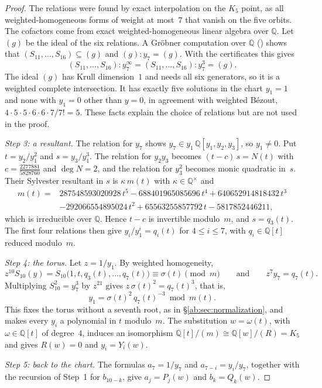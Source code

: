 \documentclass[a4paper,11pt]{article}
\newcommand{\filename}[1]{\texttt{\seqsplit{#1}}}
\theoremstyle{plain}
\theoremstyle{definition}
\theoremstyle{remark}
\begin{document}
\begin{proof}
The relations were found by exact interpolation on the $K_5$ point, as all weighted-homogeneous forms of weight at most~$7$ that vanish on the five orbits. The cofactors come from exact weighted-homogeneous linear algebra over $\mathbb{Q}$. Let $(g)$ be the ideal of the six relations. A Gr\"obner computation over $\mathbb{Q}$ (\filename{saturation\_check.py}) shows that $(S_{11},\dots,S_{16})\subseteq(g)$ and $(g):y_7=(g)$. With the certificates this gives
\[
(S_{11},\dots,S_{16}):y_7^\infty=(S_{11},\dots,S_{16}):y_7^3=(g).
\]
The ideal $(g)$ has Krull dimension~$1$ and needs all six generators, so it is a weighted complete intersection. It has exactly five solutions in the chart $y_1=1$ and none with $y_1=0$ other than $y=0$, in agreement with weighted B\'ezout, $4\cdot5\cdot5\cdot6\cdot6\cdot7/7!=5$. These facts explain the choice of relations but are not used in the proof.

\emph{Step 3: a resultant.} The relation for $y_7$ shows $y_7\in y_1\,\mathbb{Q}[y_1,y_2,y_3]$, so $y_1\neq0$. Put $t=y_2/y_1^2$ and $s=y_3/y_1^3$. The relation for $y_2y_3$ becomes $(t-c)\,s=N(t)$ with $c=\tfrac{2277881}{5828760}$ and $\deg N=2$, and the relation for $y_3^2$ becomes monic quadratic in~$s$. Their Sylvester resultant in $s$ is $\kappa\,m(t)$ with $\kappa\in\mathbb{Q}^\times$ and
\[
\begin{aligned}
m(t)={}&287548593020928\,t^5-688401965085696\,t^4+640652914818432\,t^3\\
&-292066554895024\,t^2+65563255857792\,t-5817852446211,
\end{aligned}
\]
which is irreducible over $\mathbb{Q}$. Hence $t-c$ is invertible modulo~$m$, and $s=q_3(t)$. The first four relations then give $y_i/y_1^i=q_i(t)$ for $4\le i\le 7$, with $q_i\in\mathbb{Q}[t]$ reduced modulo~$m$.

\emph{Step 4: the torus.} Let $z=1/y_1$. By weighted homogeneity,
\[
z^{10}S_{10}(y)=S_{10}\bigl(1,t,q_3(t),\dots,q_7(t)\bigr)\equiv\sigma(t)\pmod m\qquad\text{and}\qquad z^7y_7=q_7(t).
\] Multiplying $S_{10}^2=y_7^3$ by $z^{21}$ gives $z\,\sigma(t)^2=q_7(t)^3$, that is,
\[
y_1=\sigma(t)^2\,q_7(t)^{-3}\bmod m(t).
\]
This fixes the torus without a seventh root, as in \S\ref{ab:sec:normalization}, and makes every $y_i$ a polynomial in $t$ modulo~$m$. The substitution $w=\omega(t)$, with $\omega\in\mathbb{Q}[t]$ of degree~$4$, induces an isomorphism $\mathbb{Q}[t]/(m)\cong\mathbb{Q}[w]/(R)=K_5$ and gives $R(w)=0$ and $y_i=Y_i(w)$.

\emph{Step 5: back to the chart.} The formulas $a_7=1/y_7$ and $a_{7-i}=y_i/y_7$, together with the recursion of Step~1 for $b_{10-k}$, give $a_j=P_j(w)$ and $b_k=Q_k(w)$.
\end{proof}
\end{document}
